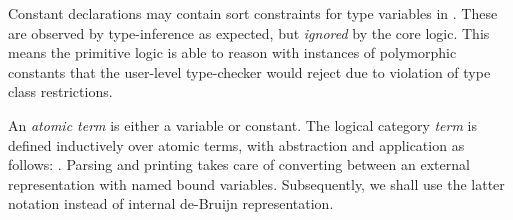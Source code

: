 \begin{isabellebody}
\begin{isamarkuptext}
  Constant declarations  may contain sort constraints
  for type variables in .  These are observed by
  type-inference as expected, but \emph{ignored} by the core logic.
  This means the primitive logic is able to reason with instances of
  polymorphic constants that the user-level type-checker would reject
  due to violation of type class restrictions.

  \medskip An \emph{atomic term} is either a variable or constant.
  The logical category \emph{term} is defined inductively over atomic
  terms, with abstraction and application as follows: .  Parsing and printing takes care of
  converting between an external representation with named bound
  variables.  Subsequently, we shall use the latter notation instead
  of internal de-Bruijn representation.


\end{isamarkuptext}
\end{isabellebody}
